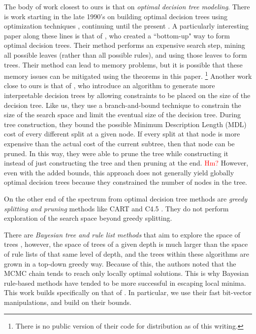 The body of work closest to ours is that on \textit{optimal decision tree modeling}. There is work starting in the late 1990's on building optimal decision trees using optimization techniques \citep[e.g.,][]{Bennett96optimaldecision,Auer95theoryand,dobkininduction}, continuing until the present \citep{e.g., farhangfar2008fast}. 
A particularly interesting paper along these lines is that of \citet{NijssenFromont2010}, who created a ``bottom-up" way to form optimal decision trees. Their method performs an expensive search step, mining all possible leaves (rather than all possible rules), and using those leaves to form trees. Their method can lead to memory problems, but it is possible that these memory issues can be mitigated using the theorems in this paper. \footnote{There is no public version of their code for distribution as of this writing.} Another work close to ours is that of \citet{Garofalakis}, who introduce an algorithm to generate more interpretable decision trees by allowing constraints to be placed on the size of the decision tree. Like us, they use a branch-and-bound technique to constrain the size of the search space and limit the eventual size of the decision tree. During tree construction, they bound the possible Minimum Description Length (MDL) cost of every different split at a given node. If every split at that node is more expensive than the actual cost of the current subtree, then that node can be pruned. In this way, they were able to prune the tree while constructing it instead of just constructing the tree and then pruning at the end. \textcolor{red}{Hm?} However, even with the added bounds, this approach does not generally yield globally optimal decision trees because they constrained the number of nodes in the tree.

On the other end of the spectrum from optimal decision tree methods are \textit{greedy splitting and pruning} methods like CART \cite{} and C4.5 \cite{}. They do not perform exploration of the search space beyond greedy splitting.

There are \textit{Bayesian tree and rule list methods} that aim to explore the space of trees \cite{Dension:1998hl,Chipman:2002hc,Chipman10}, however, the space of trees of a given depth is much larger than the space of rule lists of that same level of depth, and the trees within these algorithms are grown in a top-down greedy way. Because of this, the authors noted that the MCMC chain tends to reach only locally optimal solutions. This is why Bayesian rule-based methods \citep{LethamRuMcMa15,YangRuSe16} have tended to be more successful in escaping local minima. This work builds specifically on that of \citet{YangRuSe16}. In particular, we use their fast bit-vector manipulations, and build on their bounds. 

